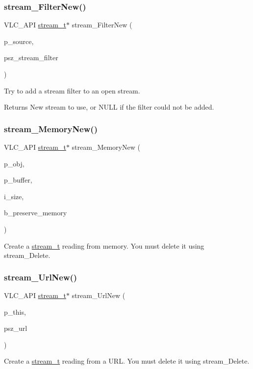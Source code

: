 \subsubsection{\texorpdfstring{stream\+\_\+\+Filter\+New()}{stream\_FilterNew()}}
{\footnotesize\ttfamily V\+L\+C\+\_\+\+A\+PI \hyperlink{structstream__t}{stream\+\_\+t}$\ast$ stream\+\_\+\+Filter\+New (\begin{DoxyParamCaption}\item[{\hyperlink{structstream__t}{stream\+\_\+t} $\ast$}]{p\+\_\+source,  }\item[{const char $\ast$}]{psz\+\_\+stream\+\_\+filter }\end{DoxyParamCaption})}

Try to add a stream filter to an open stream. \begin{DoxyReturn}{Returns}
New stream to use, or N\+U\+LL if the filter could not be added. 
\end{DoxyReturn}
\mbox{\label{group__stream_gaeadba02749316baec20ef3f5996b00f7}} 
\subsubsection{\texorpdfstring{stream\+\_\+\+Memory\+New()}{stream\_MemoryNew()}}
{\footnotesize\ttfamily V\+L\+C\+\_\+\+A\+PI \hyperlink{structstream__t}{stream\+\_\+t}$\ast$ stream\+\_\+\+Memory\+New (\begin{DoxyParamCaption}\item[{\hyperlink{structvlc__object__t}{vlc\+\_\+object\+\_\+t} $\ast$}]{p\+\_\+obj,  }\item[{uint8\+\_\+t $\ast$}]{p\+\_\+buffer,  }\item[{uint64\+\_\+t}]{i\+\_\+size,  }\item[{bool}]{b\+\_\+preserve\+\_\+memory }\end{DoxyParamCaption})}

Create a \hyperlink{structstream__t}{stream\+\_\+t} reading from memory. You must delete it using stream\+\_\+\+Delete. \mbox{\label{group__stream_gab36b7d73660ca25c2e1505cd5bd33712}} 
\subsubsection{\texorpdfstring{stream\+\_\+\+Url\+New()}{stream\_UrlNew()}}
{\footnotesize\ttfamily V\+L\+C\+\_\+\+A\+PI \hyperlink{structstream__t}{stream\+\_\+t}$\ast$ stream\+\_\+\+Url\+New (\begin{DoxyParamCaption}\item[{\hyperlink{structvlc__object__t}{vlc\+\_\+object\+\_\+t} $\ast$}]{p\+\_\+this,  }\item[{const char $\ast$}]{psz\+\_\+url }\end{DoxyParamCaption})}

Create a \hyperlink{structstream__t}{stream\+\_\+t} reading from a U\+RL. You must delete it using stream\+\_\+\+Delete. 